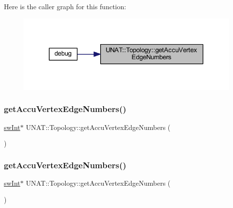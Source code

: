 Here is the caller graph for this function\+:
\nopagebreak
\begin{figure}[H]
\begin{center}
\leavevmode
\includegraphics[width=317pt]{classUNAT_1_1Topology_afdbb3f6bfe406e567fd1d88e5df6fb91_icgraph}
\end{center}
\end{figure}
\mbox{\label{classUNAT_1_1Topology_a3d3981abcf81d997aa4631014eb4643e}} 
\subsubsection{\texorpdfstring{getAccuVertexEdgeNumbers()}{getAccuVertexEdgeNumbers()}\hspace{0.1cm}{\footnotesize\ttfamily [2/3]}}
{\footnotesize\ttfamily \mbox{\hyperlink{include_2swMacro_8h_a113cf5f6b5377cdf3fac6aa4e443e9aa}{sw\+Int}}$\ast$ U\+N\+A\+T\+::\+Topology\+::get\+Accu\+Vertex\+Edge\+Numbers (\begin{DoxyParamCaption}{ }\end{DoxyParamCaption})}

\mbox{\label{classUNAT_1_1Topology_a3d3981abcf81d997aa4631014eb4643e}} 
\subsubsection{\texorpdfstring{getAccuVertexEdgeNumbers()}{getAccuVertexEdgeNumbers()}\hspace{0.1cm}{\footnotesize\ttfamily [3/3]}}
{\footnotesize\ttfamily \mbox{\hyperlink{include_2swMacro_8h_a113cf5f6b5377cdf3fac6aa4e443e9aa}{sw\+Int}}$\ast$ U\+N\+A\+T\+::\+Topology\+::get\+Accu\+Vertex\+Edge\+Numbers (\begin{DoxyParamCaption}{ }\end{DoxyParamCaption})}

